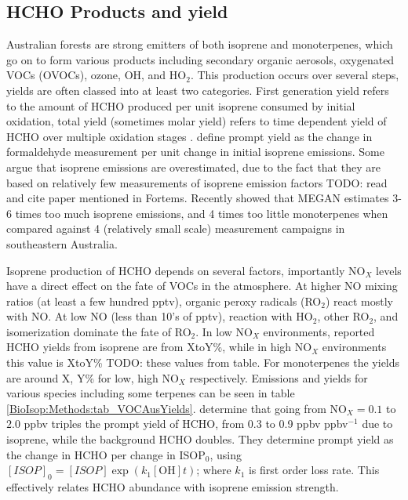   \subsection{HCHO Products and yield}
    \label{BioIsop:Methods:HCHOYield}
    Australian forests are strong emitters of both isoprene and monoterpenes, which go on to form various products including secondary organic aerosols, oxygenated VOCs (OVOCs), ozone, OH, and HO$_2$.
    This production occurs over several steps, yields are often classed into at least two categories.
    First generation yield refers to the amount of HCHO produced per unit isoprene consumed by initial oxidation, total yield (sometimes molar yield) refers to time dependent yield of HCHO over multiple oxidation stages \parencite{Wolfe2016}.
    \textcite{Wolfe2016} define prompt yield as the change in formaldehyde measurement per unit change in initial isoprene emissions.
    Some argue that isoprene emissions are overestimated, due to the fact that they are based on relatively few measurements of isoprene emission factors \parencite{Winters2009, FortemsCheiney2012} TODO: read and cite paper mentioned in Fortems.
    Recently \textcite{Emmerson2017} showed that MEGAN estimates 3-6 times too much isoprene emissions, and 4 times too little monoterpenes when compared against 4 (relatively small scale) measurement campaigns in southeastern Australia.
    
    Isoprene production of HCHO depends on several factors, importantly NO$_X$ levels have a direct effect on the fate of VOCs in the atmosphere.
    At higher NO mixing ratios (at least a few hundred pptv), organic peroxy radicals (RO$_2$) react mostly with NO. 
    At low NO (less than 10's of pptv), reaction with HO$_2$, other RO$_2$, and isomerization dominate the fate of RO$_2$.
    In low NO$_X$ environments, reported HCHO yields from isoprene are from XtoY\%, while in high NO$_X$ environments this value is XtoY\% TODO: these values from table.
    For monoterpenes the yields are around X, Y\% for low, high NO$_X$ respectively.
    Emissions and yields for various species including some terpenes can be seen in table \ref{BioIsop:Methods:tab_VOCAusYields}.
    \textcite{Wolfe2016} determine that going from NO$_X = 0.1$ to $2.0$ ppbv triples the prompt yield of HCHO, from 0.3 to 0.9 ppbv ppbv$^{-1}$ due to isoprene, while the background HCHO doubles.
    They determine prompt yield as the change in HCHO per change in ISOP$_0$, using $[ISOP]_0=[ISOP]\exp(k_1[\mathrm{OH}]t)$; where $k_1$ is first order loss rate.
    This effectively relates HCHO abundance with isoprene emission strength.
    

